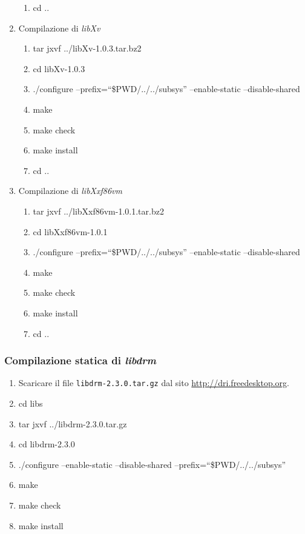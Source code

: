 \begin{enumerate}
\begin{enumerate}
\item cd ..
\end{enumerate}
\item Compilazione di \emph{libXv}
\begin{enumerate}
\item tar jxvf ../libXv-1.0.3.tar.bz2
\item cd libXv-1.0.3
\item ./configure --prefix=``\$PWD/../../subsys'' --enable-static --disable-shared
\item make
\item make check
\item make install
\item cd ..
\end{enumerate}
\item Compilazione di \emph{libXxf86vm}
\begin{enumerate}
\item tar jxvf ../libXxf86vm-1.0.1.tar.bz2
\item cd libXxf86vm-1.0.1
\item ./configure --prefix=``\$PWD/../../subsys'' --enable-static --disable-shared
\item make
\item make check
\item make install
\item cd ..
\end{enumerate}
\end{enumerate}

\subsubsection{Compilazione statica di \emph{libdrm}} \label{sssec:blender-drm}

\begin{enumerate}
\item Scaricare il file \texttt{libdrm-2.3.0.tar.gz} dal sito \href{http://dri.freedesktop.org}{http://dri.freedesktop.org}.
\item cd libs
\item tar jxvf ../libdrm-2.3.0.tar.gz
\item cd libdrm-2.3.0
\item ./configure --enable-static --disable-shared --prefix=``\$PWD/../../subsys''
\item make
\item make check
\item make install
\end{enumerate}

